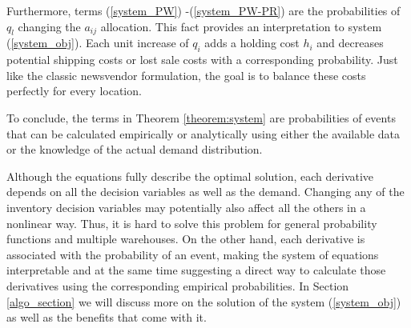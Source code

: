 \documentclass[poms,final,blindrev]{poms1_V1} %
\begin{document}


Furthermore, terms (\ref{system_PW}) -(\ref{system_PW-PR}) are the probabilities of $q_l$ changing the $a_{ij}$ allocation. This fact provides an interpretation to system (\ref{system_obj}). Each unit increase of $q_i$ adds a holding cost $h_i$ and decreases potential shipping costs or lost sale costs with a corresponding probability. Just like the classic newsvendor formulation, the goal is to balance these costs perfectly for every location.

To conclude, the terms in Theorem \ref{theorem:system} are probabilities of events that can be calculated empirically or analytically using either the available data or the knowledge of the actual demand distribution. 

Although the equations fully describe the optimal solution, each derivative depends on all the decision variables as well as the demand. Changing any of the inventory decision variables may potentially also affect all the others in a nonlinear way. Thus, it is hard to solve this problem for general probability functions and multiple warehouses.
On the other hand, each derivative is associated with the probability of an event, making the system of equations interpretable and at the same time suggesting a direct way to calculate those derivatives using the corresponding empirical probabilities.
In Section \ref{algo_section} we will discuss more on the solution of the system (\ref{system_obj}) as well as the benefits that come with it.

\end{document}
